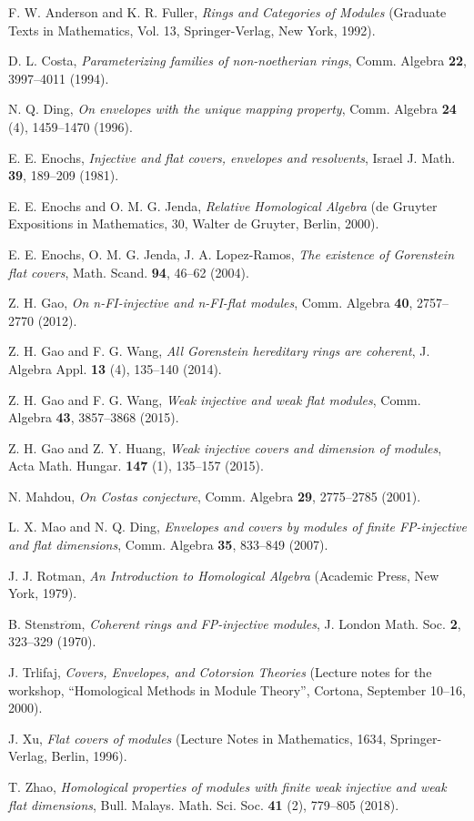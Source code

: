 ﻿\documentclass[
11pt,%
tightenlines,%
twoside,%
onecolumn,%
nofloats,%
nobibnotes,%
nofootinbib,%
superscriptaddress,%
noshowpacs,%
centertags]%
{revtex4}
\begin{document}
\begin{thebibliography}{20}

F. W. Anderson and K. R. Fuller, \textit{Rings and Categories of
Modules} (Graduate Texts in Mathematics, Vol. 13, Springer-Verlag,
New York, 1992).

 D. L. Costa, \textit{Parameterizing families of non-noetherian rings}, Comm. Algebra \textbf{22}, 3997--4011 (1994).

N. Q. Ding, \textit{On envelopes with the unique mapping property}, Comm. Algebra \textbf{24} (4), 1459--1470 (1996).

E. E. Enochs, \textit{Injective and flat covers, envelopes and
resolvents}, Israel J. Math. \textbf{39}, 189--209 (1981).

E. E. Enochs and O. M. G. Jenda,  \textit{Relative Homological
Algebra} (de Gruyter Expositions  in Mathematics, 30, Walter de
Gruyter, Berlin, 2000).

E. E. Enochs, O. M. G. Jenda, J. A. Lopez-Ramos, \textit{The
existence of Gorenstein flat covers},  Math. Scand. \textbf{94},
46--62 (2004).

Z. H. Gao, \textit{On n-FI-injective and n-FI-flat modules}, Comm.
Algebra \textbf{40}, 2757--2770 (2012).

Z. H. Gao and F. G. Wang, \textit{All Gorenstein hereditary rings
are coherent}, J.  Algebra Appl. \textbf{13} (4), 135--140 (2014).

Z. H. Gao and F. G. Wang, \textit{Weak injective and weak flat
modules}, Comm. Algebra \textbf{43},  3857--3868 (2015).

Z. H. Gao and Z. Y. Huang, \textit{Weak injective covers and
dimension of modules},  Acta Math. Hungar. \textbf{147} (1),
135--157 (2015).

 N. Mahdou, \textit{On Costas conjecture}, Comm. Algebra \textbf{29}, 2775--2785 (2001).

L. X. Mao and N. Q. Ding, \textit{Envelopes and covers by modules of
finite  FP-injective and flat dimensions}, Comm. Algebra
\textbf{35}, 833--849 (2007).

 J. J. Rotman, \textit{An Introduction to Homological Algebra} (Academic Press, New York, 1979).

B. Stenstr$\ddot o$m, \textit{Coherent rings and FP-injective
modules}, J. London Math. Soc. \textbf{2}, 323--329 (1970).

J. Trlifaj, \textit{Covers, Envelopes, and Cotorsion Theories}
(Lecture notes for the workshop,  ``Homological Methods in Module
Theory'', Cortona, September 10--16, 2000).

J. Xu, {\it Flat covers of modules} (Lecture Notes in Mathematics, 1634, Springer-Verlag, Berlin, 1996).

T. Zhao, \textit{Homological properties of modules with finite weak
injective and weak flat dimensions},  Bull. Malays. Math. Sci. Soc.
\textbf{41} (2), 779--805 (2018).

\end{thebibliography}
\end{document}
